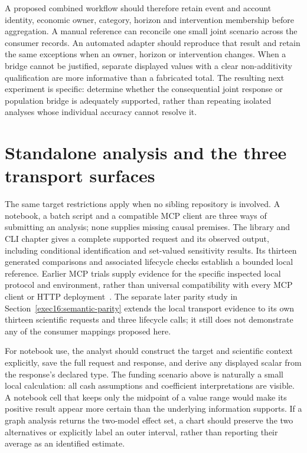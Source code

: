 A proposed combined workflow should therefore retain event and account
identity, economic owner, category, horizon and intervention membership before
aggregation. A manual reference can reconcile one small joint scenario across
the consumer records. An automated adapter should reproduce that result and
retain the same exceptions when an owner, horizon or intervention changes.
When a bridge cannot be justified, separate displayed values with a clear
non-additivity qualification are more informative than a fabricated total.
The resulting next experiment is specific: determine whether the consequential
joint response or population bridge is adequately supported, rather than
repeating isolated analyses whose individual accuracy cannot resolve it.


\section{Standalone analysis and the three transport surfaces}

The same target restrictions apply when no sibling repository is involved.
A notebook, a batch script and a compatible MCP client are three ways of
submitting an analysis; none supplies missing causal premises. The library
and CLI chapter gives a complete supported request and its observed output,
including conditional identification and set-valued sensitivity results.
Its thirteen generated comparisons and associated lifecycle checks establish
a bounded local reference. Earlier MCP trials supply evidence for the
specific inspected local protocol and environment, rather than universal
compatibility with every MCP client or HTTP deployment~\citep{exec13_i2_examples,v12_in_runtime}. The separate later parity study in Section~\ref{exec16:semantic-parity} extends the local transport evidence to its own thirteen scientific requests and three lifecycle calls; it still does not demonstrate any of the consumer mappings proposed here.

For notebook use, the analyst should construct the target and scientific
context explicitly, save the full request and response, and derive any
displayed scalar from the response's declared type. The funding scenario
above is naturally a small local calculation: all cash assumptions and
coefficient interpretations are visible. A notebook cell that keeps only
the midpoint of a value range would make its positive result appear more
certain than the underlying information supports. If a graph analysis
returns the two-model effect set, a chart should preserve the two alternatives
or explicitly label an outer interval, rather than reporting their average
as an identified estimate.

